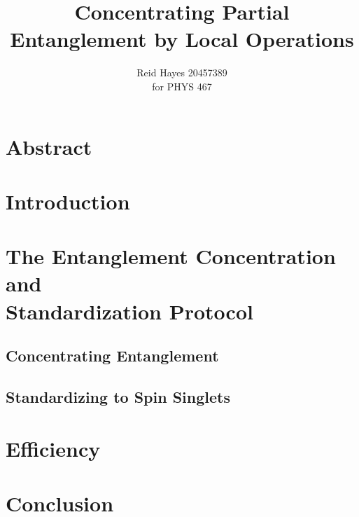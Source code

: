 \documentclass[12pt,letterpaper]{article}
\author{Reid Hayes 20457389\\
for PHYS 467}
\title{Concentrating Partial Entanglement by Local Operations}
\begin{document}
\maketitle
\section{Abstract}

\section{Introduction}


\section{The Entanglement Concentration and \\Standardization Protocol}
\subsection{Concentrating Entanglement}
\label{sec:concentrating}


\subsection{Standardizing to Spin Singlets}
\label{sec:standardizing}

\section{Efficiency}

\pagebreak
\section{Conclusion}

\pagebreak
\printbibliography
\end{document}
